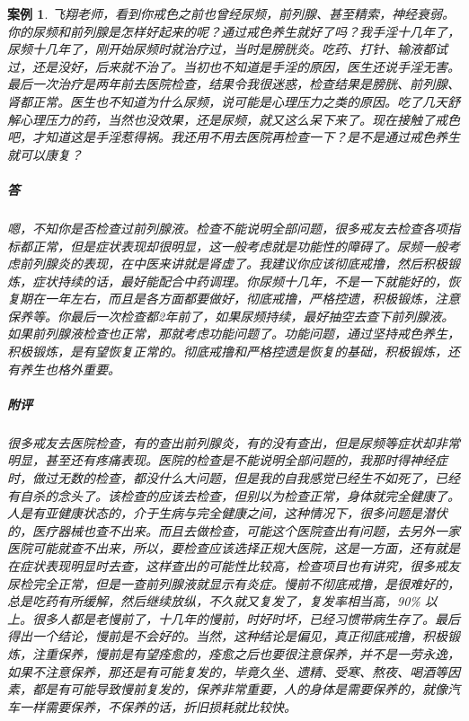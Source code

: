 \documentclass{ctexart}
\newtheorem{case}{案例}
\begin{document}
\begin{case}
    飞翔老师，看到你戒色之前也曾经尿频，前列腺、甚至精索，神经衰弱。你的尿频和前列腺是怎样好起来的呢？通过戒色养生就好了吗？我手淫十几年了，尿频十几年了，刚开始尿频时就治疗过，当时是膀胱炎。吃药、打针、输液都试过，还是没好，后来就不治了。当初也不知道是手淫的原因，医生还说手淫无害。最后一次治疗是两年前去医院检查，结果令我很迷惑，检查结果是膀胱、前列腺、肾都正常。医生也不知道为什么尿频，说可能是心理压力之类的原因。吃了几天舒解心理压力的药，当然也没效果，还是尿频，就又这么呆下来了。现在接触了戒色吧，才知道这是手淫惹得祸。我还用不用去医院再检查一下？是不是通过戒色养生就可以康复？
    \subparagraph{答} 嗯，不知你是否检查过前列腺液。检查不能说明全部问题，很多戒友去检查各项指标都正常，但是症状表现却很明显，这一般考虑就是功能性的障碍了。尿频一般考虑前列腺炎的表现，在中医来讲就是肾虚了。我建议你应该彻底戒撸，然后积极锻炼，症状持续的话，最好能配合中药调理。你尿频十几年，不是一下就能好的，恢复期在一年左右，而且是各方面都要做好，彻底戒撸，严格控遗，积极锻炼，注意保养等。你最后一次检查都2年前了，如果尿频持续，最好抽空去查下前列腺液。如果前列腺液检查也正常，那就考虑功能问题了。功能问题，通过坚持戒色养生，积极锻炼，是有望恢复正常的。彻底戒撸和严格控遗是恢复的基础，积极锻炼，还有养生也格外重要。
    \subparagraph{附评} 很多戒友去医院检查，有的查出前列腺炎，有的没有查出，但是尿频等症状却非常明显，甚至还有疼痛表现。医院的检查是不能说明全部问题的，我那时得神经症时，做过无数的检查，都没什么大问题，但是我的自我感觉已经生不如死了，已经有自杀的念头了。该检查的应该去检查，但别以为检查正常，身体就完全健康了。人是有亚健康状态的，介于生病与完全健康之间，这种情况下，很多问题是潜伏的，医疗器械也查不出来。而且去做检查，可能这个医院查出有问题，去另外一家医院可能就查不出来，所以，要检查应该选择正规大医院，这是一方面，还有就是在症状表现明显时去查，这样查出的可能性比较高，检查项目也有讲究，很多戒友尿检完全正常，但是一查前列腺液就显示有炎症。慢前不彻底戒撸，是很难好的，总是吃药有所缓解，然后继续放纵，不久就又复发了，复发率相当高，90\% 以上。很多人都是老慢前了，十几年的慢前，时好时坏，已经习惯带病生存了。最后得出一个结论，慢前是不会好的。当然，这种结论是偏见，真正彻底戒撸，积极锻炼，注重保养，慢前是有望痊愈的，痊愈之后也要很注意保养，并不是一劳永逸，如果不注意保养，那还是有可能复发的，毕竟久坐、遗精、受寒、熬夜、喝酒等因素，都是有可能导致慢前复发的，保养非常重要，人的身体是需要保养的，就像汽车一样需要保养，不保养的话，折旧损耗就比较快。
\end{case}
\end{document}
